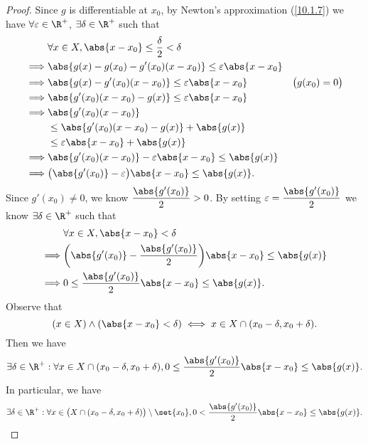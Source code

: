 \begin{proof}
  Since \(g\) is differentiable at \(x_0\), by Newton's approximation (\cref{10.1.7}) we have \(\forall \varepsilon \in \R^+\), \(\exists \delta \in \R^+\) such that
  \begin{align*}
             & \forall x \in X, \abs{x - x_0} \leq \dfrac{\delta}{2} < \delta                               \\
    \implies & \abs{g(x) - g(x_0) - g'(x_0)(x - x_0)} \leq \varepsilon \abs{x - x_0}                        \\
    \implies & \abs{g(x) - g'(x_0)(x - x_0)} \leq \varepsilon \abs{x - x_0}          & \big(g(x_0) = 0\big) \\
    \implies & \abs{g'(x_0)(x - x_0) - g(x)} \leq \varepsilon \abs{x - x_0}                                 \\
    \implies & \abs{g'(x_0)(x - x_0)}                                                                       \\
             & \leq \abs{g'(x_0)(x - x_0) - g(x)} + \abs{g(x)}                                              \\
             & \leq \varepsilon \abs{x - x_0} + \abs{g(x)}                                                  \\
    \implies & \abs{g'(x_0)(x - x_0)} - \varepsilon \abs{x - x_0} \leq \abs{g(x)}                           \\
    \implies & \big(\abs{g'(x_0)} - \varepsilon\big)\abs{x - x_0} \leq \abs{g(x)}.
  \end{align*}
  Since \(g'(x_0) \neq 0\), we know \(\dfrac{\abs{g'(x_0)}}{2} > 0\).
  By setting \(\varepsilon = \dfrac{\abs{g'(x_0)}}{2}\) we know \(\exists \delta \in \R^+\) such that
  \begin{align*}
             & \forall x \in X, \abs{x - x_0} < \delta                                            \\
    \implies & \bigg(\abs{g'(x_0)} - \dfrac{\abs{g'(x_0)}}{2}\bigg) \abs{x - x_0} \leq \abs{g(x)} \\
    \implies & 0 \leq \dfrac{\abs{g'(x_0)}}{2} \abs{x - x_0} \leq \abs{g(x)}.
  \end{align*}
  Observe that
  \[
    (x \in X) \land (\abs{x - x_0} < \delta) \iff x \in X \cap (x_0 - \delta, x_0 + \delta).
  \]
  Then we have
  \[
    \exists \delta \in \R^+ : \forall x \in X \cap (x_0 - \delta, x_0 + \delta), 0 \leq \dfrac{\abs{g'(x_0)}}{2} \abs{x - x_0} \leq \abs{g(x)}.
  \]
  In particular, we have
  \[
    \exists \delta \in \R^+ : \forall x \in \big(X \cap (x_0 - \delta, x_0 + \delta)\big) \setminus \set{x_0}, 0 < \dfrac{\abs{g'(x_0)}}{2} \abs{x - x_0} \leq \abs{g(x)}.
\]
\end{proof}
